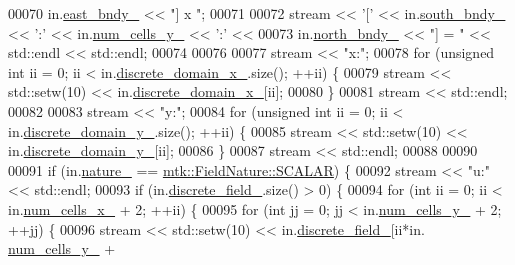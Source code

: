 \begin{DoxyCode}
00070   in.\hyperlink{classmtk_1_1UniStgGrid2D_ae24f3d5bf5ed3a6d066cdf48aa1fb307}{east\_bndy\_} << \textcolor{stringliteral}{"] x "};
00071 
00072   stream << \textcolor{charliteral}{'['} << in.\hyperlink{classmtk_1_1UniStgGrid2D_ac228c81fad7f4feeae93fb3c09d7e175}{south\_bndy\_} << \textcolor{charliteral}{':'} << in.\hyperlink{classmtk_1_1UniStgGrid2D_a3e4f61d781212ad57c34e9446c4074b6}{num\_cells\_y\_} << \textcolor{charliteral}{':'} <<
00073   in.\hyperlink{classmtk_1_1UniStgGrid2D_a3f904091b6e74aa78d8543e5cba26afb}{north\_bndy\_} << \textcolor{stringliteral}{"] = "} << std::endl << std::endl;
00074 
00076 
00077   stream << \textcolor{stringliteral}{"x:"};
00078   \textcolor{keywordflow}{for} (\textcolor{keywordtype}{unsigned} \textcolor{keywordtype}{int} ii = 0; ii < in.\hyperlink{classmtk_1_1UniStgGrid2D_ab15979865852583a46662ea592f27a4f}{discrete\_domain\_x\_}.size(); ++ii) \{
00079     stream << std::setw(10) << in.\hyperlink{classmtk_1_1UniStgGrid2D_ab15979865852583a46662ea592f27a4f}{discrete\_domain\_x\_}[ii];
00080   \}
00081   stream << std::endl;
00082 
00083   stream << \textcolor{stringliteral}{"y:"};
00084   \textcolor{keywordflow}{for} (\textcolor{keywordtype}{unsigned} \textcolor{keywordtype}{int} ii = 0; ii < in.\hyperlink{classmtk_1_1UniStgGrid2D_ad69f93d4b27707d97f209b907383a7a2}{discrete\_domain\_y\_}.size(); ++ii) \{
00085     stream << std::setw(10) << in.\hyperlink{classmtk_1_1UniStgGrid2D_ad69f93d4b27707d97f209b907383a7a2}{discrete\_domain\_y\_}[ii];
00086   \}
00087   stream << std::endl;
00088 
00090 
00091   \textcolor{keywordflow}{if} (in.\hyperlink{classmtk_1_1UniStgGrid2D_ac8b66740d328803f7fbabd1c42c775b2}{nature\_} == \hyperlink{namespacemtk_ga4c54f2a329cfb4e56213b02a259d19e2a8f3d9a4b6a7b7f2c7afa61ca113d0db9}{mtk::FieldNature::SCALAR}) \{
00092     stream << \textcolor{stringliteral}{"u:"} << std::endl;
00093     \textcolor{keywordflow}{if} (in.\hyperlink{classmtk_1_1UniStgGrid2D_ad7474b2669ee988b84aed20b7f5dc7be}{discrete\_field\_}.size() > 0) \{
00094       \textcolor{keywordflow}{for} (\textcolor{keywordtype}{int} ii = 0; ii < in.\hyperlink{classmtk_1_1UniStgGrid2D_ac03a0f4840ee6ae1bc853e5d9c0df8d1}{num\_cells\_x\_} + 2; ++ii) \{
00095         \textcolor{keywordflow}{for} (\textcolor{keywordtype}{int} jj = 0; jj < in.\hyperlink{classmtk_1_1UniStgGrid2D_a3e4f61d781212ad57c34e9446c4074b6}{num\_cells\_y\_} + 2; ++jj) \{
00096           stream << std::setw(10) << in.\hyperlink{classmtk_1_1UniStgGrid2D_ad7474b2669ee988b84aed20b7f5dc7be}{discrete\_field\_}[ii*in.
      \hyperlink{classmtk_1_1UniStgGrid2D_a3e4f61d781212ad57c34e9446c4074b6}{num\_cells\_y\_} +

\end{DoxyCode}
